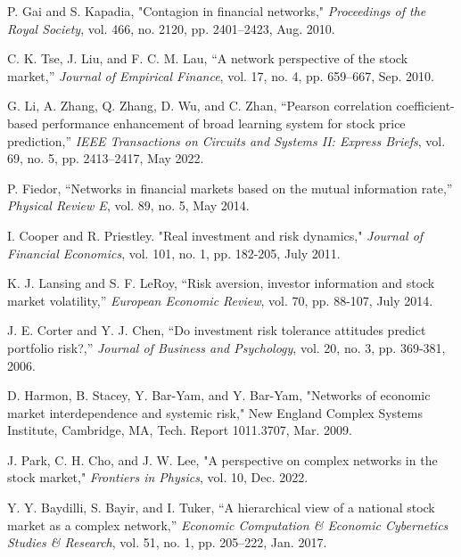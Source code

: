 \documentclass[letterpaper, 10 pt, proceedings]{ieeetran}
\begin{document}
\begin{thebibliography}{99}
		
		P. Gai and S. Kapadia, "Contagion in financial networks," \textit{Proceedings of the Royal Society}, vol. 466, no. 2120, pp. 2401–2423, Aug. 2010.
		
		C. K. Tse, J. Liu, and F. C. M. Lau, “A network perspective of the stock market,” \textit{Journal of Empirical Finance}, vol. 17, no. 4, pp. 659–667, Sep. 2010. %
		
		G. Li, A. Zhang, Q. Zhang, D. Wu, and C. Zhan, “Pearson correlation coefficient-based performance enhancement of broad learning system for stock price prediction,” \textit{IEEE Transactions on Circuits and Systems II: Express Briefs}, vol. 69, no. 5, pp. 2413–2417, May 2022. %
		
		P. Fiedor, “Networks in financial markets based on the mutual information rate,” \textit{Physical Review E}, vol. 89, no. 5, May 2014. %
		
		I. Cooper and R. Priestley. "Real investment and risk dynamics," \textit{Journal of Financial Economics}, vol. 101, no. 1, pp. 182-205, July 2011.
		
		K. J. Lansing and S. F. LeRoy, “Risk aversion, investor information and stock market volatility,” \textit{European Economic Review}, vol. 70, pp. 88-107, July 2014. 
		
		J. E. Corter and Y. J. Chen, “Do investment risk tolerance attitudes predict portfolio risk?,” \textit{Journal of Business and Psychology}, vol. 20, no. 3, pp. 369-381, 2006.
		
		D. Harmon, B. Stacey, Y. Bar-Yam, and Y. Bar-Yam, "Networks of economic market interdependence and systemic risk," New England Complex Systems Institute, Cambridge, MA, Tech. Report 1011.3707, Mar. 2009.
		
		J. Park, C. H. Cho, and J. W. Lee, "A perspective on complex networks in the stock market," \textit{Frontiers in Physics}, vol. 10, Dec. 2022. %
		
		Y. Y. Baydilli, S. Bayir, and I. Tuker, “A hierarchical view of a national stock market as a complex network,” \textit{Economic Computation \& Economic Cybernetics Studies \& Research}, vol. 51, no. 1, pp. 205–222, Jan. 2017.
		
		
		
	\end{thebibliography}
\end{document}
